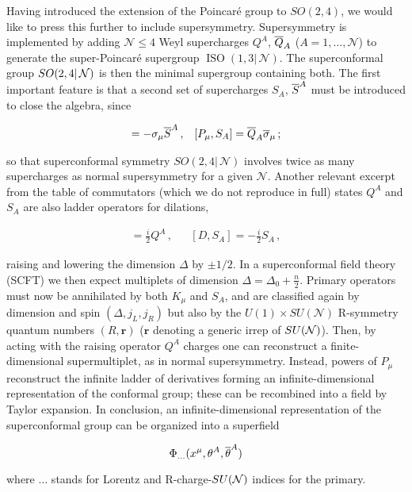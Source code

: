 Having introduced the extension of the Poincar\'e group to $SO(2,4)$, we would like to press this further to include supersymmetry. Supersymmetry is implemented by adding $\mathcal{N} \leq 4$ Weyl supercharges $Q^A$, $\overline{Q}_A$ ($A=1,\ldots,\mathcal{N}$) to generate the super-Poincar\'e supergroup $\operatorname{ISO}(1,3|\,\mathcal{N})$. The superconformal group $SO(2,4|\,\mathcal{N})$ is then the minimal supergroup containing both. The first important feature is that a second set of supercharges $S_A$, $\overline{S}^A$ must be introduced to close the algebra, since

\begin{align}
	[K_\mu , Q^A] = - \sigma_\mu \scj{S}^A\,, && [P_\mu, S_A] = \scj{Q}_A  \scj\sigma_\mu \,;
	\label{}
\end{align}

so that superconformal symmetry $SO(2,4|\,\mathcal{N})$ involves twice as many supercharges as normal supersymmetry for a given $\mathcal{N}$. Another relevant excerpt from the table of commutators (which we do not reproduce in full) states $Q^A$ and $S_A$ are also ladder operators for dilations,

\begin{align}
	[D,Q^A] = \frac{i}{2} Q^A\,, && [D,S_A] = - \frac{i}{2} S_A\,,
	\label{}
\end{align}

raising and lowering the dimension $\Delta$ by $\pm 1/2$. In a superconformal field theory (SCFT) we then expect multiplets of dimension $\Delta = \Delta_0 + \frac{n}{2}$. Primary operators must now be annihilated by both $K_\mu$ and $S_A$, and are classified again by dimension and spin $(\Delta,j_L,j_R)$ but also by the $U(1)\times SU(\mathcal{N})$ R-symmetry quantum numbers $(R,\mathbf{r})$ ($\mathbf{r}$ denoting a generic irrep of $SU(\mathcal{N})$). Then, by acting with the raising operator $Q^A$ charges one can reconstruct a finite-dimensional supermultiplet, as in normal supersymmetry. Instead, powers of $P_\mu$ reconstruct the infinite ladder of derivatives forming an infinite-dimensional representation of the conformal group; these can be recombined into a field by Taylor expansion. In conclusion, an infinite-dimensional representation of the superconformal group can be organized into a superfield

\begin{equation}
	\Phi_{\ldots} (x^\mu , \theta^A, \overline{\theta}^A)
	\label{}
\end{equation}

where $\ldots$ stands for Lorentz and R-charge-$SU(\mathcal{N})$ indices for the primary.

